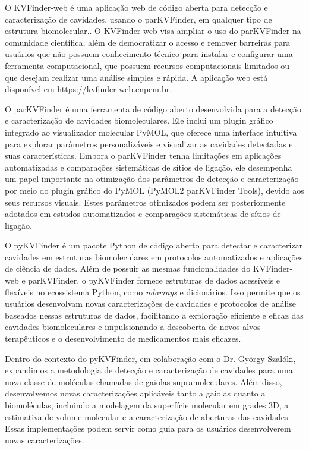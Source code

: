 \documentclass[Portugues]{phdquali}
\begin{document}
O KVFinder-web é uma aplicação web de código aberta para detecção e caracterização de cavidades, usando o parKVFinder, em qualquer tipo de estrutura biomolecular.. O KVFinder-web visa ampliar o uso do parKVFinder na comunidade científica, além de democratizar o acesso e remover barreiras para usuários que não possuem conhecimento técnico para instalar e configurar uma ferramenta computacional, que possuem recursos computacionais limitados ou que desejam realizar uma análise simples e rápida. A aplicação web está disponível em \url{https://kvfinder-web.cnpem.br}.

O parKVFinder é uma ferramenta de código aberto desenvolvida para a detecção e caracterização de cavidades biomoleculares. Ele inclui um plugin gráfico integrado ao visualizador molecular PyMOL, que oferece uma interface intuitiva para explorar parâmetros personalizáveis e visualizar as cavidades detectadas e suas características. Embora o parKVFinder tenha limitações em aplicações automatizadas e comparações sistemáticas de sítios de ligação, ele desempenha um papel importante na otimização dos parâmetros de detecção e caracterização por meio do plugin gráfico do PyMOL (PyMOL2 parKVFinder Tools), devido aos seus recursos visuais. Estes parâmetros otimizados podem ser posteriormente adotados em estudos automatizados e comparações sistemáticas de sítios de ligação.

O pyKVFinder é um pacote Python de código aberto para detectar e caracterizar cavidades em estruturas biomoleculares em protocolos automatizados e aplicações de ciência de dados. Além de possuir as mesmas funcionalidades do KVFinder-web e parKVFinder, o pyKVFinder fornece estruturas de dados acessíveis e flexíveis no ecossistema Python, como \textit{ndarrays} e dicionários. Isso permite que os usuários desenvolvam novas caracterizações de cavidades e protocolos de análise baseados nessas estruturas de dados, facilitando a exploração eficiente e eficaz das cavidades biomoleculares e impulsionando a descoberta de novos alvos terapêuticos e o desenvolvimento de medicamentos mais eficazes.

Dentro do contexto do pyKVFinder, em colaboração com o Dr. György Szalóki, expandimos a metodologia de detecção e caracterização de cavidades para uma nova classe de moléculas chamadas de gaiolas supramoleculares. Além disso, desenvolvemos novas caracterizações aplicáveis tanto a gaiolas quanto a biomoléculas, incluindo a modelagem da superfície molecular em grades 3D, a estimativa de volume molecular e a caracterização de aberturas das cavidades. Essas implementações podem servir como guia para os usuários desenvolverem novas caracterizações.
\end{document}
